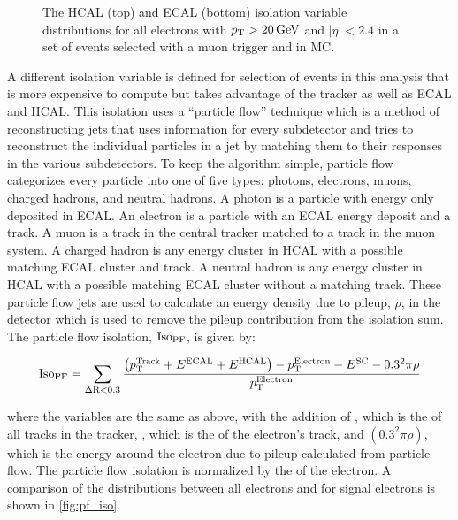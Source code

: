 \begin{figure}[!htbp]
\begin{subfigure}[b]{\StackedPlotWidth}
        \caption{}
        \label{fig:ecal_iso}
    \end{subfigure}
    \caption[
        Distributions of HCAL and ECAL isolation variables in data and MC.
    ]{
        The HCAL (top) and ECAL (bottom) isolation variable distributions for
        all electrons with $p_{\mathrm{T}} > 20 \,\text{Ge\hspace{-.08em}V}$ and $|\eta| < 2.4$ in a set of
        events selected with a muon trigger and in \MADGRAPH \Ztoee MC.
    }
    \label{fig:hcal_ecal_isos}
\end{figure}

A different isolation variable is defined for selection of events in this
analysis that is more expensive to compute but takes advantage of the tracker
as well as ECAL and HCAL. This isolation uses a
``particle flow'' \cite{particle_flow_2009}\cite{particle_flow_2010} technique which
is a method of reconstructing jets that uses information for every subdetector
and tries to reconstruct the individual particles in a jet by matching them to
their responses in the various subdetectors. To keep the algorithm simple,
particle flow categorizes every particle into one of five types: photons,
electrons, muons, charged hadrons, and neutral hadrons. A photon is a particle
with energy only deposited in ECAL. An electron is a particle with an ECAL
energy deposit and a track. A muon is a track in the central tracker matched to
a track in the muon system. A charged hadron is any energy cluster in HCAL with
a possible matching ECAL cluster and track. A neutral hadron is any energy
cluster in HCAL with a possible matching ECAL cluster without a matching track.
These particle flow jets are used to calculate an energy density due to pileup,
$\rho$, in the detector which is used to remove the pileup contribution from
the isolation sum. The particle flow isolation, $\text{Iso}_{\text{PF}}$, is given by:

\begin{equation}
    \text{Iso}_{\text{PF}} = \sum_{\Delta \text{R}<0.3} \frac{\left(p_{\mathrm{T}}^{\text{Track}} + E^{\text{ECAL}} + E^{\text{HCAL}}\right) - p_{\mathrm{T}}^{\text{Electron}}
    - E^{\text{SC}} - 0.3^{2} \pi \rho}{p_{\mathrm{T}}^{\text{Electron}}}
\end{equation}

\noindent where the variables are the same as above, with the addition of \ptTrack, which
is the \pt of all tracks in the tracker, \ptElectron, which is the \pt of the
electron's track, and $\left(0.3^{2} \pi \rho\right)$, which is the energy
around the electron due to pileup calculated from particle flow. The
particle flow isolation is normalized by the \pt of the electron. A comparison
of the \PFISO distributions between all electrons and for signal electrons is
shown in \cref{fig:pf_iso}.

